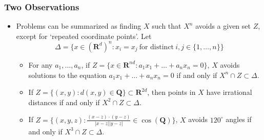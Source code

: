 \documentclass[usenames,dvipsnames]{beamer}
\begin{document}
\begin{frame}
    \frametitle{Two Observations}

    \begin{itemize}
        \item Problems can be summarized as finding $X$ such that $X^n$ avoids a given set $Z$, except for `repeated coordinate points'. Let
        \[ \Delta = \{ x \in (\mathbf{R}^d)^n: x_i = x_j\ \text{for distinct}\ i,j \in \{ 1, \dots, n \} \} \]
        \vspace{-1.5em}


        \begin{itemize}
           \item For any $a_1, \dots, a_n$, if $Z = \{ x \in \mathbf{R}^{nd}: a_1x_1 + \dots + a_nx_n = 0 \}$, $X$ avoids solutions to the equation $a_1x_1 + \dots + a_nx_n = 0$ if and only if $X^n \cap Z \subset \Delta$.

            \item If $Z = \{ (x,y): d(x,y) \in \mathbf{Q} \} \subset \mathbf{R}^{2d}$, then points in $X$ have irrational distances if and only if $X^2 \cap Z \subset \Delta$.

            \item If $Z = \{ (x,y,z): \frac{(x-z) \cdot (y-z)}{|x-z||y-z|} \in \cos(\mathbf{Q}) \}$, $X$ avoids $120^\circ$ angles if and only if $X^3 \cap Z \subset \Delta$.
        \end{itemize}
    \end{itemize}
\end{frame}
\end{document}

